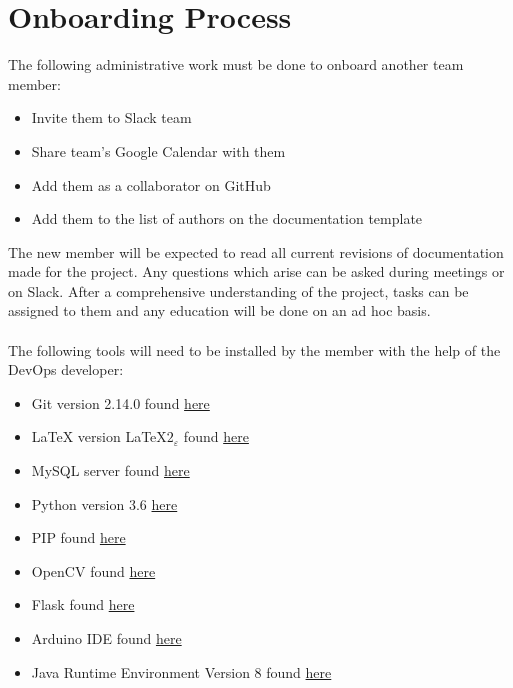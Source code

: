 \documentclass[11pt]{article}
\begin{document}
\section{Onboarding Process}
The following administrative work must be done to onboard another team member:
\begin{itemize}
\item Invite them to Slack team
\item Share team's Google Calendar with them
\item Add them as a collaborator on GitHub
\item Add them to the list of authors on the documentation template
\end{itemize}
The new member will be expected to read all current revisions of documentation made for the project. Any questions which arise can be asked during meetings or on Slack. After a comprehensive understanding of the project, tasks can be assigned to them and any education will be done on an ad hoc basis. \\\\
The following tools will need to be installed by the member with the help of the DevOps developer:
\begin{itemize}
\item Git version 2.14.0 found \href{https://git-scm.com}{here}
\item LaTeX version \LaTeX  $2_\varepsilon$ found \href{https://www.latex-project.org/get/}{here}
\item MySQL server found \href{https://dev.mysql.com/downloads/installer/}{here}
\item Python version 3.6 \href{https://www.python.org/downloads/}{here}
\item PIP found \href{https://pip.pypa.io/en/stable/installing/}{here}
\item OpenCV found \href{https://pypi.python.org/pypi/opencv-python}{here}
\item Flask found \href{http://flask.pocoo.org/docs/0.12/installation/}{here}
\item Arduino IDE found \href{https://www.arduino.cc/en/Main/Software}{here}
\item Java Runtime Environment Version 8 found \href{https://java.com/en/download/}{here}
\end{itemize}
\end{document}
